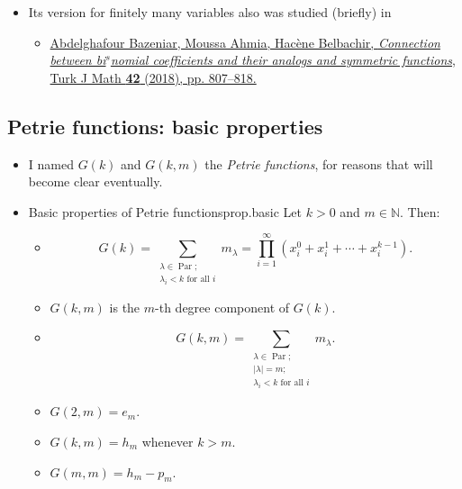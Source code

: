 \documentclass[numbers=enddot,12pt,final,onecolumn,notitlepage]{scrartcl}%
\newcommand{\red}{\color{red}}
\newcommand{\defn}[1]{{\color{darkred}\emph{#1}}}
\newcommand{\0}{\phantom{c}}
\let\sumnonlimits\sum
\let\prodnonlimits\prod
\renewcommand{\sum}{\sumnonlimits\limits}
\renewcommand{\prod}{\prodnonlimits\limits}
\newcommand{\nowbox}{\hphantom{x} \vspace{-1.5pc}}
\begin{document}
\begin{itemize}
\item Its version for finitely many variables also was studied (briefly) in
\begin{itemize}
\item {\red
\href{https://doi.org/10.3906/mat-1705-27}{Abdelghafour Bazeniar, Moussa Ahmia, Hac\`{e}ne
Belbachir, \textit{Connection between bi}$^{s}$\textit{nomial coefficients and
their analogs and symmetric functions}, Turk J Math \textbf{42} (2018), pp.
807--818.}}
\end{itemize}
\end{itemize}

\subsection{Petrie functions: basic properties}

\begin{itemize}
\item I named $G\left(  k\right)  $ and $G\left(  k,m\right)  $ the
\defn{Petrie functions}, for reasons that will become clear eventually.

\item \nowbox
\begin{proposition}{Basic properties of Petrie functions}{prop.basic}
Let $k > 0$ and $m \in \mathbb{N}$. Then:

\begin{itemize}
\item
\[
G\left(  k\right)  =\sum_{\substack{\lambda\in\operatorname*{Par}%
;\\\lambda_{i}<k\text{ for all }i}}m_{\lambda}=\prod_{i=1}^{\infty}\left(
x_{i}^{0}+x_{i}^{1}+\cdots+x_{i}^{k-1}\right)  .
\]


\item $G\left(  k,m\right)  $ is the $m$-th degree component of $G\left(
k\right)  $.

\item
\[
G\left(  k,m\right)  =\sum_{\substack{\lambda\in\operatorname*{Par}%
;\\\left\vert \lambda\right\vert =m;\\\lambda_{i}<k\text{ for all }%
i}}m_{\lambda}.
\]


\item $G\left(  2,m\right)  =e_{m}$.

\item $G\left(  k,m\right)  =h_{m}$ whenever $k>m$.

\item $G\left(  m,m\right)  =h_{m}-p_{m}$.
\end{itemize}
\end{proposition}

\end{itemize}
\end{document}
